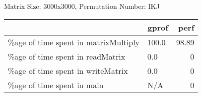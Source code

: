 \documentclass{article}
\begin{document}
    Matrix Size: 3000x3000, Permutation Number: IKJ \\
    \begin{tabular}{llr}
\hline
                                      & gprof   &   perf \\
\hline
 \%age of time spent in matrixMultiply & 100.0   &  98.89 \\
 \%age of time spent in readMatrix     & 0.0     &   0    \\
 \%age of time spent in writeMatrix    & 0.0     &   0    \\
 \%age of time spent in main           & N/A     &   0    \\
\hline
\end{tabular}
    
\end{document}
